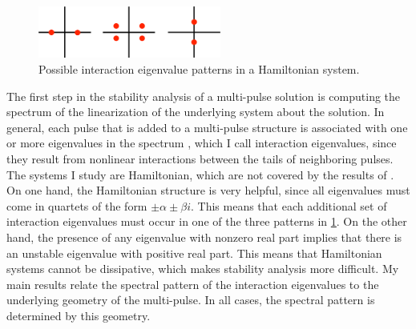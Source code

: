 \documentclass[12pt,reqno,oneside,hidelinks]{article}
\begin{document}
\begin{figure}
    \includegraphics[width=6cm]{images/inteigpattern.eps}
    \caption{Possible interaction eigenvalue patterns in a Hamiltonian system.} 
    \label{fig:inteigpattern}
\end{figure}
The first step in the stability analysis of a multi-pulse solution is computing the spectrum of the linearization of the underlying system about the solution. In general, each pulse that is added to a multi-pulse structure is associated with one or more eigenvalues in the spectrum \cite{Sandstede1998}, which I call interaction eigenvalues, since they result from nonlinear interactions between the tails of neighboring pulses. The systems I study are Hamiltonian, which are not covered by the results of \cite{Sandstede1998}. On one hand, the Hamiltonian structure is very helpful, since all eigenvalues must come in quartets of the form $\pm \alpha \pm \beta i$. This means that each additional set of interaction eigenvalues must occur in one of the three patterns in \cref{fig:inteigpattern}. On the other hand, the presence of any eigenvalue with nonzero real part implies that there is an unstable eigenvalue with positive real part. This means that Hamiltonian systems cannot be dissipative, which makes stability analysis more difficult. My main results relate the spectral pattern of the interaction eigenvalues to the underlying geometry of the multi-pulse. In all cases, the spectral pattern is determined by this geometry. 
\end{document}
